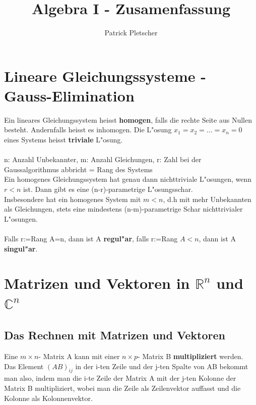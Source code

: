 \documentclass[10pt, a4paper, twocolumn]{scrartcl}
\title{Algebra I - Zusamenfassung}
\author{Patrick Pletscher}
\begin{document}
\maketitle

\section{Lineare Gleichungssysteme - Gauss-Elimination}

Ein lineares Gleichungssystem heisst {\bf homogen}, falls die rechte Seite aus Nullen besteht. Andernfalls heisst es inhomogen. Die L"osung $x_1=x_2=\ldots=x_n=0$ eines Systems heisst {\bf triviale} L"osung.\\\\

n: Anzahl Unbekannter, m: Anzahl Gleichungen, r: Zahl bei der Gaussalgorithmus abbricht = Rang des Systems \\

Ein homogenes Gleichungssystem hat genau dann nichttriviale L"osungen, wenn $r < n$ ist. Dann gibt es eine (n-r)-parametrige L"osungsschar.\\
Insbesondere hat ein homogenes System mit $m < n$, d.h mit mehr Unbekannten als Gleichungen, stets eine mindestens (n-m)-parametrige Schar nichttrivialer L"osungen.\\\\

Falls r:=Rang A=n, dann ist A {\bf regul"ar}, falls r:=Rang $A<n$, dann ist A {\bf singul"ar}.\\


\section{Matrizen und Vektoren in $\mathbb{R}^n$ und $\mathbb{C}^n$}

\subsection{Das Rechnen mit Matrizen und Vektoren}
Eine $m\times n$- Matrix A kann mit einer $n\times p$- Matrix B {\bf multipliziert} werden.\\
Das Element $(AB)_{ij}$ in der i-ten Zeile und der j-ten Spalte von AB bekommt man also, indem man die i-te Zeile der Matrix A mit der j-ten Kolonne der Matrix B multipliziert, wobei man die Zeile als Zeilenvektor auffasst und die Kolonne als Kolonnenvektor.\\\\
\end{document}
